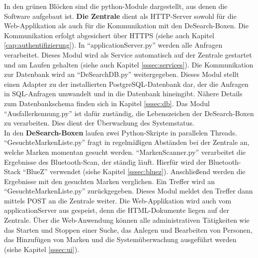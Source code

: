 In den grünen Blöcken sind die python-Module dargestellt, aus denen die Software aufgebaut ist. \textbf{Die Zentrale} dient als HTTP-Server sowohl für die Web-Applikation als auch für die Kommunikation mit den DeSearch-Boxen. Die Kommunikation erfolgt abgesichert über HTTPS (siehe auch Kapitel \ref{cap:authentifizierung}). In \enquote{applicationServer.py} werden alle Anfragen verarbeitet. Dieses Modul wird als Service automatisch auf der Zentrale gestartet und am Laufen gehalten (siehe auch Kapitel \ref{sssec:services}). Die Kommunikation zur Datenbank wird an \enquote{DeSearchDB.py} weitergegeben. Dieses Modul stellt einen Adapter zu der installierten PostgreSQL-Datenbank dar, der die Anfragen in SQL-Anfragen umwandelt und in die Datenbank hineingibt. Nähere Details zum Datenbankschema finden sich in Kapitel \ref{sssec:db}. Das Modul \enquote{Ausfallerkennung.py} ist dafür zuständig, die Lebenszeichen der DeSearch-Boxen zu verarbeiten. Dies dient der Überwachung des Systemstatus.\\
In den \textbf{DeSearch-Boxen} laufen zwei Python-Skripte in parallelen Threads. \enquote{GesuchteMarkenListe.py} fragt in regelmäßigen Abständen bei der Zentrale an, welche Marken momentan gesucht werden. \enquote{MarkenScanner.py} verarbeitet die Ergebnisse des Bluetooth-Scan, der ständig läuft. Hierfür wird der Bluetooth-Stack \enquote{BlueZ} verwendet (siehe Kapitel \ref{sssec:bluez}). Anschließend werden die Ergebnisse mit den gesuchten Marken verglichen.  Ein Treffer wird an \enquote{GesuchteMarkenListe.py} zurückgegeben. Dieses Modul meldet den Treffer dann mittels POST an die Zentrale weiter. Die Web-Applikation wird auch vom applicationServer aus gespeist, denn die HTML-Dokumente liegen auf der Zentrale. Über die Web-Anwendung können alle administrativen Tätigkeiten wie das Starten und Stoppen einer Suche, das Anlegen und Bearbeiten von Personen, das Hinzufügen von Marken und die Systemüberwachung ausgeführt werden (siehe Kapitel \ref{sssec:ui}). 



